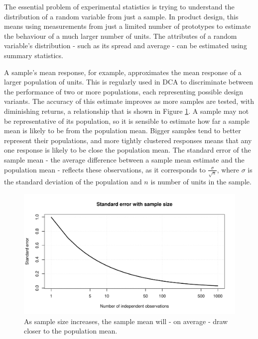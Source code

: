 \documentclass[11pt,a4paper,article]{memoir} %
\begin{document}
\par
The essential problem of experimental statistics is trying to understand the distribution of a random variable from just a sample. In product design, this means using measurements from just a limited number of prototypes to estimate the behaviour of a much larger number of units. The attributes of a random variable's distribution - such as its spread and average - can be estimated using summary statistics.
 \par
A sample's mean response, for example, approximates the mean response of a larger population of units. This is regularly used in DCA to discriminate between the performance of two or more populations, each representing possible design variants. The accuracy of this estimate improves as more samples are tested, with diminishing returns, a relationship that is shown in Figure \ref{fig:se_with_sample_size}. A sample may not be representative of its population, so it is sensible to estimate how far a sample mean is likely to be from the population mean. Bigger samples tend to better represent their populations, and more tightly clustered responses means that any one response is likely to be close the population mean. The standard error of the sample mean - the average difference between a sample mean estimate and the population mean - reflects these observations, as it corresponds to $\frac{\sigma}{\sqrt{n}}$, where $\sigma$ is the standard deviation of the population and $n$ is number of units in the sample.
\begin{figure}[h]
\includegraphics[width=\textwidth]{se_with_sample_size.pdf}
\caption{As sample size increases, the sample mean will - on average - draw closer to the population mean.}
\label{fig:se_with_sample_size}
\end{figure}
\end{document}
